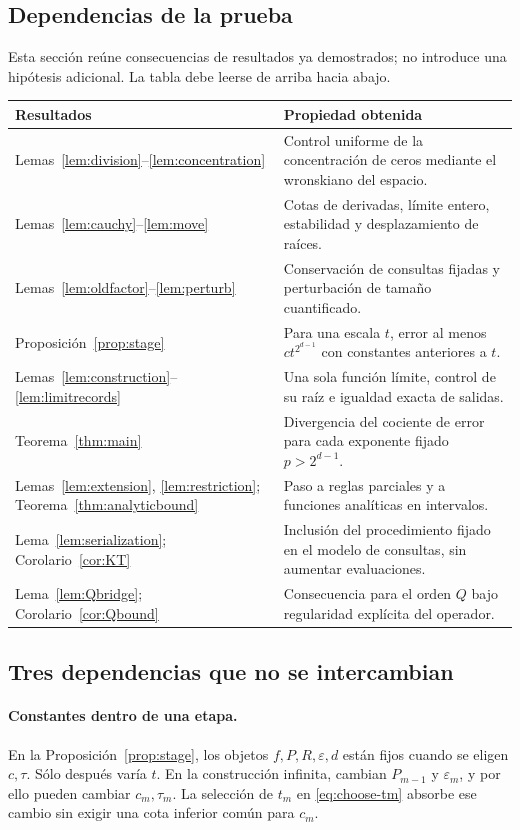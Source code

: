 \documentclass[11pt,a4paper]{article}
\numberwithin{equation}{section}
\theoremstyle{definition}
\theoremstyle{remark}
\begin{document}
\subsection{Dependencias de la prueba}
Esta sección reúne consecuencias de resultados ya demostrados; no introduce una hipótesis adicional. La tabla debe leerse de arriba hacia abajo.
\begin{center}
\begin{tabular}{@{}p{}p{}@{}}
\toprule
Resultados & Propiedad obtenida\\
\midrule
Lemas~\ref{lem:division}--\ref{lem:concentration}
& Control uniforme de la concentración de ceros mediante el wronskiano del espacio.\\[4pt]
Lemas~\ref{lem:cauchy}--\ref{lem:move}
& Cotas de derivadas, límite entero, estabilidad y desplazamiento de raíces.\\[4pt]
Lemas~\ref{lem:oldfactor}--\ref{lem:perturb}
& Conservación de consultas fijadas y perturbación de tamaño cuantificado.\\[4pt]
Proposición~\ref{prop:stage}
& Para una escala $t$, error al menos $ct^{2^{d-1}}$ con constantes anteriores a $t$.\\[4pt]
Lemas~\ref{lem:construction}--\ref{lem:limitrecords}
& Una sola función límite, control de su raíz e igualdad exacta de salidas.\\[4pt]
Teorema~\ref{thm:main}
& Divergencia del cociente de error para cada exponente fijado $p>2^{d-1}$.\\[4pt]
Lemas~\ref{lem:extension}, \ref{lem:restriction}; Teorema~\ref{thm:analyticbound}
& Paso a reglas parciales y a funciones analíticas en intervalos.\\[4pt]
Lema~\ref{lem:serialization}; Corolario~\ref{cor:KT}
& Inclusión del procedimiento fijado en el modelo de consultas, sin aumentar evaluaciones.\\[4pt]
Lema~\ref{lem:Qbridge}; Corolario~\ref{cor:Qbound}
& Consecuencia para el orden $Q$ bajo regularidad explícita del operador.\\
\bottomrule
\end{tabular}
\end{center}

\subsection{Tres dependencias que no se intercambian}
\paragraph{Constantes dentro de una etapa.}
En la Proposición~\ref{prop:stage}, los objetos $f,P,R,\varepsilon,d$ están fijos cuando se eligen $c,\tau$. Sólo después varía $t$. En la construcción infinita, cambian $P_{m-1}$ y $\varepsilon_m$, y por ello pueden cambiar $c_m,\tau_m$. La selección de $t_m$ en \eqref{eq:choose-tm} absorbe ese cambio sin exigir una cota inferior común para $c_m$.
\end{document}
